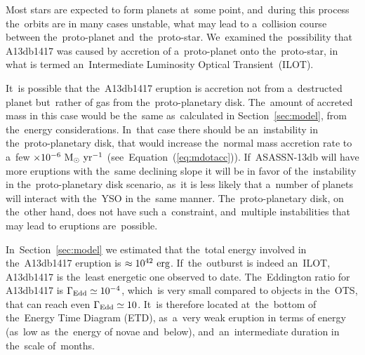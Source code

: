 \documentclass[galaxies,article,accept,moreauthors,pdftex]{mdpi}
\def \msyr{~\rm{M_{\odot}}~\rm{yr^{-1}}}
\def \erg{~\rm{erg}}
\begin{document}
Most stars are expected to form planets at~some point, and~during this process the~orbits are in many cases unstable, what may lead to a~collision course between the~proto-planet and~the~proto-star. We~examined the~possibility that A13db1417 was caused by accretion of a~proto-planet onto the~proto-star, in what is termed an~Intermediate Luminosity Optical Transient~(ILOT).

It~is possible that the~A13db1417 eruption is accretion not from a~destructed planet but~rather of gas from the~proto-planetary disk. The~amount of accreted mass in this case would be the~same as~calculated in Section~\ref{sec:model}, from the~energy considerations. In~that case there should be an~instability in the~proto-planetary disk, that would increase the~normal mass accretion rate to a~few $\times 10^{-6} \msyr$ (see~Equation~(\ref{eq:mdotacc})). If~ASASSN-13db will have more eruptions with the~same declining slope it will be in favor of the~instability in the~proto-planetary disk scenario, as~it is less likely that a~number of planets will interact with the~YSO in the~same manner. The~proto-planetary disk, on the~other hand, does not have such a~constraint, and~multiple instabilities that may lead to eruptions are~possible.

In~Section~\ref{sec:model} we estimated that the~total energy involved in the~A13db1417 eruption is $ \approx 10^{42} \erg$. If~the~outburst is indeed an~ILOT, A13db1417 is the~least energetic one observed to date. The~Eddington ratio for A13db1417 is $\Gamma_{\rm Edd} \simeq 10^{-4}$, which~is very small compared to objects in the~OTS, that can reach even $\Gamma_{\rm Edd} \simeq 10$. %
It~is therefore located at~the~bottom of the~Energy Time Diagram (ETD), as~a~very weak eruption in terms of energy (as~low as~the~energy of novae and~below), and~an~intermediate duration in the~scale of~months.

\end{document}
